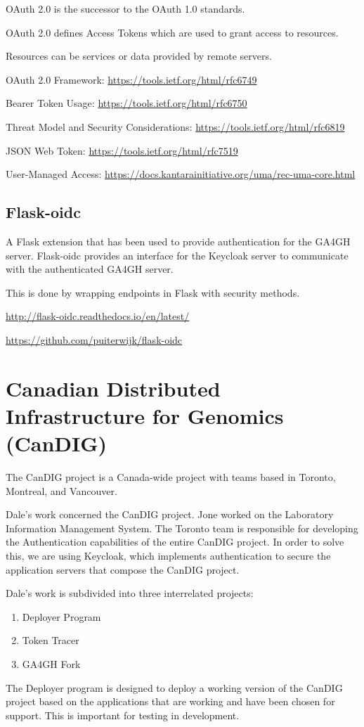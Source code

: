 \documentclass{article}
\begin{document}
OAuth 2.0 is the successor to the OAuth 1.0 standards.

OAuth 2.0 defines Access Tokens
which are used to grant access to resources.

Resources can be services or data provided by remote servers.

OAuth 2.0 Framework:
\url{https://tools.ietf.org/html/rfc6749}

Bearer Token Usage:
\url{https://tools.ietf.org/html/rfc6750}

Threat Model and Security Considerations:
\url{https://tools.ietf.org/html/rfc6819}

JSON Web Token:
\url{https://tools.ietf.org/html/rfc7519}

User-Managed Access:
\url{https://docs.kantarainitiative.org/uma/rec-uma-core.html}

\subsection{Flask-oidc}

A Flask extension that has been used to provide authentication
for the GA4GH server. Flask-oidc provides an interface
for the Keycloak server to communicate with the authenticated
GA4GH server.

This is done by wrapping endpoints in Flask with security methods.

\url{http://flask-oidc.readthedocs.io/en/latest/}

\url{https://github.com/puiterwijk/flask-oidc}

\section{Canadian Distributed Infrastructure for Genomics (CanDIG)}

The CanDIG project is a Canada-wide project with teams based in Toronto, Montreal, and Vancouver.


Dale's work concerned the CanDIG project. Jone worked on the Laboratory Information Management System.
The Toronto team is responsible for developing the Authentication capabilities of the entire CanDIG project.
In order to solve this, we are using Keycloak, which implements authentication to secure the application
servers that compose the CanDIG project.

Dale's work is subdivided into three interrelated projects:
\begin{enumerate}
\item Deployer Program
\item Token Tracer
\item GA4GH Fork
\end{enumerate}
The Deployer program is designed to deploy a working version of the CanDIG project based on the applications that are working and have been chosen for support. This is important for testing in development.
\end{document}
